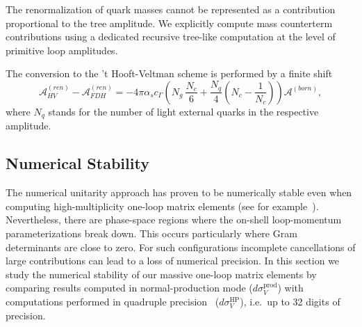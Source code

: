The renormalization of quark masses cannot be represented as a contribution proportional to the tree amplitude. We explicitly
compute mass counterterm contributions using a dedicated recursive tree-like computation at the level of primitive loop amplitudes.

The conversion to the 't Hooft-Veltman scheme is performed by a finite shift~\cite{Signer:2008va}
%
\begin{equation}
  \mathcal{A}^{(ren)}_{HV} - \mathcal{A}^{(ren)}_{FDH} = -4\pi \alpha_s c_\Gamma\left(N_{g}~\frac{N_c}{6} + \frac{N_q}{4}\left(N_c -\frac{1}{N_c}\right)\right)\mathcal{A}^{(born)},
  \label{schemeshift}
\end{equation}
%
where $N_q$ stands for the number of light external quarks in the respective amplitude.


\subsection{Numerical Stability}
%
The numerical unitarity approach has proven to be numerically stable even when
computing high-multiplicity one-loop matrix elements (see for example~\cite{BH:W3jDistributions,BH:W5j}). Nevertheless,
there are phase-space regions where the on-shell loop-momentum parameterizations break down. This occurs particularly where Gram determinants are close
to zero. For such configurations incomplete cancellations of large contributions can
lead to a loss of numerical precision. 
In this section we study
the numerical stability of our  massive one-loop matrix elements by comparing
results computed in normal-production mode ($d\sigma_V^\mathrm{prod}$) with computations performed in
quadruple precision~\cite{QD} ($d\sigma_V^\mathrm{HP}$), i.e.\ up to 32 digits of precision.

